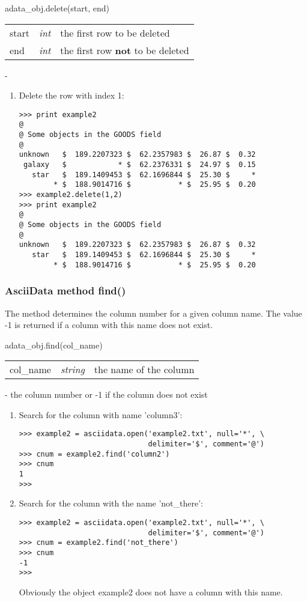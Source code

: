 adata\_obj.delete(start, end)

\begin{tabular}{lcl}
start &{\it int}& the first row to be deleted\\
end   &{\it int}& the first row {\bf not} to be deleted\\
\end{tabular}

-

\begin{enumerate}
\item Delete the row with index 1:
\begin{verbatim}
>>> print example2
@
@ Some objects in the GOODS field
@
unknown   $  189.2207323 $  62.2357983 $  26.87 $  0.32
 galaxy   $            * $  62.2376331 $  24.97 $  0.15
   star   $  189.1409453 $  62.1696844 $  25.30 $     *
        * $  188.9014716 $           * $  25.95 $  0.20
>>> example2.delete(1,2)
>>> print example2
@
@ Some objects in the GOODS field
@
unknown   $  189.2207323 $  62.2357983 $  26.87 $  0.32
   star   $  189.1409453 $  62.1696844 $  25.30 $     *
        * $  188.9014716 $           * $  25.95 $  0.20
\end{verbatim}
\end{enumerate}

\subsubsection{AsciiData method find()}
\label{adm_find}
The method determines the column number for a given column name.
The value -1 is returned if a column with this name does not exist.

adata\_obj.find(col\_name)

\begin{tabular}{lcl}
col\_name &{\it string}& the name of the column\\
\end{tabular}

- the column number or -1 if the column does not exist

\begin{enumerate}
\item Search for the column with name 'column3':
\begin{verbatim}
>>> example2 = asciidata.open('example2.txt', null='*', \
                              delimiter='$', comment='@')
>>> cnum = example2.find('column2')
>>> cnum
1
>>>
\end{verbatim}
\item Search for the column with the name 'not\_there':
\begin{verbatim}
>>> example2 = asciidata.open('example2.txt', null='*', \
                              delimiter='$', comment='@')
>>> cnum = example2.find('not_there')
>>> cnum
-1
>>>
\end{verbatim}
Obviously the \ad object example2 does not have a column with this name.
\end{enumerate}

